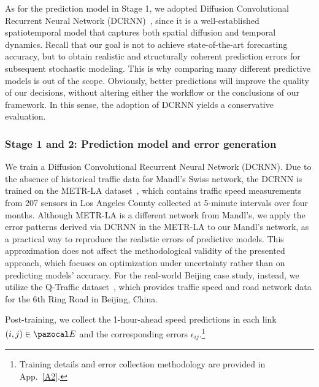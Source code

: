 \documentclass[a4paper,fleqn]{cas-sc}
\begin{document}
As for the prediction model in Stage 1, we adopted Diffusion Convolutional Recurrent Neural Network (DCRNN)~\citep{li2017diffusion}, since it is a well-established spatiotemporal model that captures both spatial diffusion and temporal dynamics. Recall that our goal is not to achieve state-of-the-art forecasting accuracy, but to obtain realistic and structurally coherent prediction errors for subsequent stochastic modeling. This is why comparing many different predictive models is out of the scope. Obviously, better predictions will improve the quality of our decisions, without altering either the workflow or the conclusions of our framework. In this sense, the adoption of DCRNN yields a conservative evaluation.


\subsubsection{Stage 1 and 2: Prediction model and error generation}\label{sec:errorStage1}

We train a Diffusion Convolutional Recurrent Neural Network (DCRNN). 
Due to the absence of historical traffic data for Mandl’s Swiss network, the DCRNN is trained on the METR-LA dataset~\citep{li2017diffusion}, which contains traffic speed measurements from 207 sensors in Los Angeles County collected at 5-minute intervals over four months. Although METR-LA is a different network from Mandl's, we apply the error patterns derived via DCRNN in the METR-LA to our Mandl's network, as a practical way to reproduce the realistic errors of predictive models. This approximation does not affect the methodological validity of the presented approach, which focuses on optimization under uncertainty rather than on predicting models' accuracy.
%
For the real-world Beijing case study, instead, we utilize the Q-Traffic dataset~\citep{liao2018deep}, which provides traffic speed and road network data for the 6th Ring Road in Beijing, China. 

Post-training, we collect the 1-hour-ahead speed predictions in each link $(i,j)\in\pazocal E$ and the corresponding errors $\epsilon_{ij}$.\footnote{Training details and error collection methodology are provided in App.~\ref{A2}.}

\end{document}
